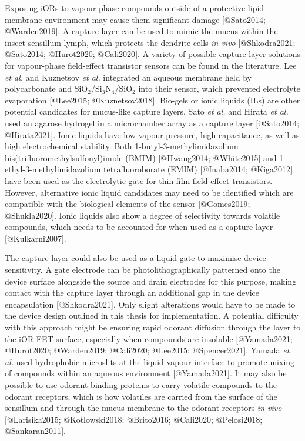 \documentclass[
  letterpaper,
  DIV=11,
  numbers=noendperiod]{scrartcl}
\begin{document}
Exposing iORs to vapour-phase compounds outside of a protective lipid
membrane environment may cause them significant damage {[}@Sato2014;
@Warden2019{]}. A capture layer can be used to mimic the mucus within
the insect sensillum lymph, which protects the dendrite cells \emph{in
vivo} {[}@Shkodra2021; @Sato2014; @Hurot2020; @Cali2020{]}. A variety of
possible capture layer solutions for vapour-phase field-effect
transistor sensors can be found in the literature. Lee \emph{et al.} and
Kuznetsov \emph{et al.} integrated an aqueous membrane held by
polycarbonate and SiO\(_2\)/Si\(_3\)N\(_4\)/SiO\(_2\) into their sensor,
which prevented electrolyte evaporation {[}@Lee2015; @Kuznetsov2018{]}.
Bio-gels or ionic liquids (ILs) are other potential candidates for
mucus-like capture layers. Sato \emph{et al.} and Hirata \emph{et al.}
used an agarose hydrogel in a microchamber array as a capture layer
{[}@Sato2014; @Hirata2021{]}. Ionic liquids have low vapour pressure,
high capacitance, as well as high electrochemical stability. Both
1-butyl-3-methylimidazolium bis(trifluoromethylsulfonyl)imide (BMIM)
{[}@Hwang2014; @White2015{]} and 1-ethyl-3-methylimidazolium
tetrafluoroborate (EMIM) {[}@Inaba2014; @Kiga2012{]} have been used as
the electrolytic gate for thin-film field-effect transistors. However,
alternative ionic liquid candidates may need to be identified which are
compatible with the biological elements of the sensor {[}@Gomes2019;
@Shukla2020{]}. Ionic liquids also show a degree of selectivity towards
volatile compounds, which needs to be accounted for when used as a
capture layer {[}@Kulkarni2007{]}.

The capture layer could also be used as a liquid-gate to maximise device
sensitivity. A gate electrode can be photolithographically patterned
onto the device surface alongside the source and drain electrodes for
this purpose, making contact with the capture layer through an
additional gap in the device encapsulation {[}@Shkodra2021{]}. Only
slight alterations would have to be made to the device design outlined
in this thesis for implementation. A potential difficulty with this
approach might be ensuring rapid odorant diffusion through the layer to
the iOR-FET surface, especially when compounds are insoluble
{[}@Yamada2021; @Hurot2020; @Warden2019; @Cali2020; @Lee2015;
@Spencer2021{]}. Yamada \emph{et al.} used hydrophobic microslits at the
liquid-vapour interface to promote mixing of compounds within an aqueous
environment {[}@Yamada2021{]}. It may also be possible to use odorant
binding proteins to carry volatile compounds to the odorant receptors,
which is how volatiles are carried from the surface of the sensillum and
through the mucus membrane to the odorant receptors \emph{in vivo}
{[}@Larisika2015; @Kotlowski2018; @Brito2016; @Cali2020; @Pelosi2018;
@Sankaran2011{]}.
\end{document}

